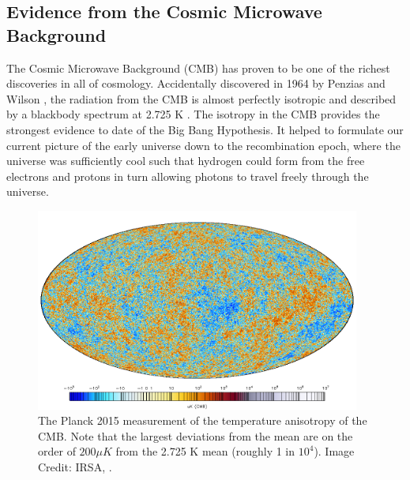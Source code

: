 \subsection{Evidence from the Cosmic Microwave Background}

The Cosmic Microwave Background (CMB) has proven to be one of the richest discoveries in all of cosmology.  Accidentally discovered in 1964 by Penzias and Wilson \cite{penzias1965measurement}, the radiation from the CMB is almost perfectly isotropic and described by a blackbody spectrum at 2.725 K \cite{fixsen1996cosmic}.  The isotropy in the CMB provides the strongest evidence to date of the Big Bang Hypothesis. It helped to formulate our current picture of the early universe down to the recombination epoch, where the universe was sufficiently cool such that hydrogen could form from the free electrons and protons in turn allowing photons to travel freely through the universe.  

\begin{figure}[ht]
	\centering
	\includegraphics[width=0.95\textwidth]{planck_map}
	\caption{The Planck 2015 measurement of the temperature anisotropy of the CMB.  Note that the largest deviations from the mean are on the order of $200 \mu K$ from the 2.725 K mean (roughly 1 in $10^4$).  Image Credit: IRSA, .}
	\label{fig:planck_map}
\end{figure}

